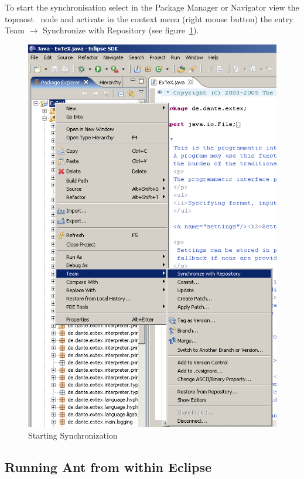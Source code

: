 \documentclass{extex-doc}
\newcommand\menu{\textsf}
\newcommand\sub{\(\rightarrow\) }
\begin{document}
To start the synchronisation select in the \menu{Package Manager} or
\menu{Navigator} view the topmost \ExTeX\ node and activate in the
context menu (right mouse button) the entry \menu{Team \sub Synchronize
with Repository} (see figure~\ref{fig:eclipse-team}).
\begin{figure}[htp]
  \centering
  \includegraphics[scale=.4]{image/eclipse-team}
  \caption{Starting Synchronization}\label{fig:eclipse-team}
\end{figure}



\INCOMPLETE



\subsection{Running Ant from within Eclipse}\label{sec:eclipse.ant}
\end{document}
